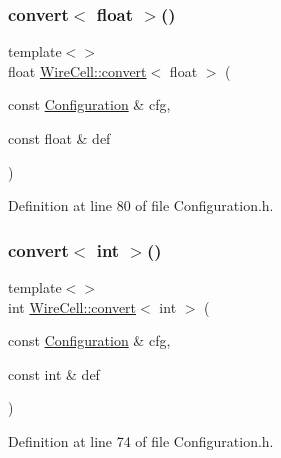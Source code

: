 \subsubsection{\texorpdfstring{convert$<$ float $>$()}{convert< float >()}}
{\footnotesize\ttfamily template$<$$>$ \\
float \hyperlink{namespace_wire_cell_a5f6648d6ae801b20a17b8a35fd3306e5}{Wire\+Cell\+::convert}$<$ float $>$ (\begin{DoxyParamCaption}\item[{const \hyperlink{namespace_wire_cell_a9f705541fc1d46c608b3d32c182333ee}{Configuration} \&}]{cfg,  }\item[{const float \&}]{def }\end{DoxyParamCaption})\hspace{0.3cm}{\ttfamily [inline]}}



Definition at line 80 of file Configuration.\+h.

\mbox{\label{namespace_wire_cell_aaf4b353f8d18d8e510569614e22b8bab}} 
\subsubsection{\texorpdfstring{convert$<$ int $>$()}{convert< int >()}}
{\footnotesize\ttfamily template$<$$>$ \\
int \hyperlink{namespace_wire_cell_a5f6648d6ae801b20a17b8a35fd3306e5}{Wire\+Cell\+::convert}$<$ int $>$ (\begin{DoxyParamCaption}\item[{const \hyperlink{namespace_wire_cell_a9f705541fc1d46c608b3d32c182333ee}{Configuration} \&}]{cfg,  }\item[{const int \&}]{def }\end{DoxyParamCaption})\hspace{0.3cm}{\ttfamily [inline]}}



Definition at line 74 of file Configuration.\+h.


